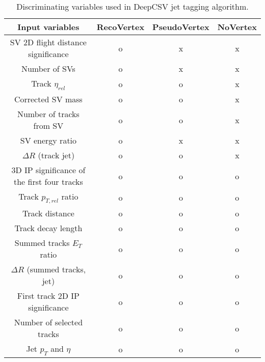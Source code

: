 \begin{table}[htp]
\begin{tabular}{cccc} 
Input variables & RecoVertex & PseudoVertex & NoVertex\\ 
\midrule
SV 2D flight distance significance & o & x & x\\
Number of SVs & o & x & x\\
Track $\eta_{rel}$ & o & o & x\\
Corrected SV mass & o & o & x\\
Number of tracks from SV & o & o & x\\
SV energy ratio & o & x & x\\
$\Delta R$ (track jet) & o & o & x\\
3D IP significance of the first four tracks & o & o & o\\
Track $p_{T,rel}$ ratio & o & o & o \\
Track distance & o & o & o\\
Track decay length & o & o & o\\
Summed tracks $E_T$ ratio & o & o & o\\
$\Delta R$ (summed tracks, jet) & o & o & o\\
First track 2D IP significance &o & o &o\\
Number of selected tracks & o & o & o\\
Jet $p_T$ and $\eta$ & o & o & o\\
\end{tabular}
\caption{Discriminating variables used in DeepCSV jet tagging algorithm.\cite{Sirunyan_2018}}
\end{table}